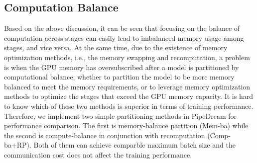 \subsection{Computation Balance}
Based on the above discussion, it can be seen that
focusing on the balance of computation across stages
can easily lead to imbalanced memory usage among stages, and vice versa.
At the same time, due to the existence of memory optimization methods,
i.e., the memory swapping and recomputation,
a problem is when the GPU memory has oversubscribed
after a model is partitioned by computational balance,
whether to partition the model to be more memory balanced to meet the memory requirements,
or to leverage memory optimization methods to optimize
the stages that exceed the GPU memory capacity.
It is hard to know which of these two methods is superior in terms of training performance.
Therefore, we implement two simple partitioning methods in PipeDream for performance comparison.
The first is memory-balance partition (Mem-ba) while the second
is compute-balance in conjunction with recomputation (Comp-ba+RP).
Both of them can achieve comparble maximum batch size
and the communication cost does not affect the training performance.


